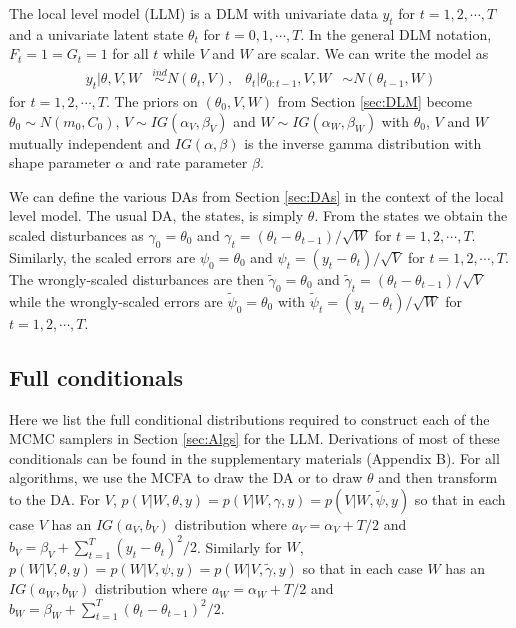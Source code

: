 \documentclass[12pt]{article}
\begin{document}
The local level model (LLM) is a DLM with univariate data $y_t$ for $t=1,2,\cdots,T$ and a univariate latent state $\theta_t$ for $t=0,1,\cdots,T$. In the general DLM notation, $F_t=1=G_t=1$ for all $t$ while $V$ and $W$ are scalar. We can write the model as
\begin{align*}
  y_t |\theta,V,W& \stackrel{ind}{\sim} N(\theta_t,V), &
  \theta_t |\theta_{0:t-1},V,W& \sim N(\theta_{t-1},W)
\end{align*}
for $t=1,2,\cdots,T$. The priors on $(\theta_0,V,W)$ from Section \ref{sec:DLM} become $\theta_0\sim N(m_0,C_0)$, $V\sim IG(\alpha_V,\beta_V)$ and $W\sim IG(\alpha_W,\beta_W)$ with $\theta_0$, $V$ and $W$ mutually independent and $IG(\alpha,\beta)$ is the inverse gamma distribution with shape parameter $\alpha$ and rate parameter $\beta$.

We can define the various DAs from Section \ref{sec:DAs} in the context of the local level model. The usual DA, the states, is simply $\theta$. From the states we obtain the scaled disturbances as $\gamma_0=\theta_0$ and $\gamma_t = (\theta_t - \theta_{t-1})/\sqrt{W}$ for $t=1,2,\cdots,T$. Similarly, the scaled errors are $\psi_0=\theta_0$ and $\psi_t = (y_t - \theta_t)/\sqrt{V}$ for $t=1,2,\cdots,T$. The wrongly-scaled disturbances are then $\tilde{\gamma}_{0}=\theta_0$ and $\tilde{\gamma}_t = (\theta_t - \theta_{t-1})/\sqrt{V}$ while the wrongly-scaled errors are $\tilde{\psi}_0=\theta_0$ with $\tilde{\psi}_t = (y_t - \theta_t)/\sqrt{W}$ for $t=1,2,\cdots,T$. 

\subsection{Full conditionals}\label{sec:LLM:fullcond}

Here we list the full conditional distributions required to construct each of the MCMC samplers in Section \ref{sec:Algs} for the LLM. Derivations of most of these conditionals can be found in the supplementary materials (Appendix B). For all algorithms, we use the MCFA to draw the DA or to draw $\theta$ and then transform to the DA. For $V$, $p(V|W,\theta,y)=p(V|W,\gamma,y)=p(V|W,\tilde{\psi},y)$ so that in each case $V$ has an $IG(a_V,b_V)$ distribution where $a_V = \alpha_V + T/2$ and $b_V = \beta_V + \sum_{t=1}^T(y_t - \theta_t)^2/2$. Similarly for $W$, $p(W|V,\theta,y)=p(W|V,\psi,y)=p(W|V,\tilde{\gamma},y)$ so that in each case $W$ has an $IG(a_W, b_W)$ distribution where $a_W = \alpha_W + T/2$ and $b_W = \beta_W + \sum_{t=1}^T(\theta_t - \theta_{t-1})^2/2$.
\end{document}
